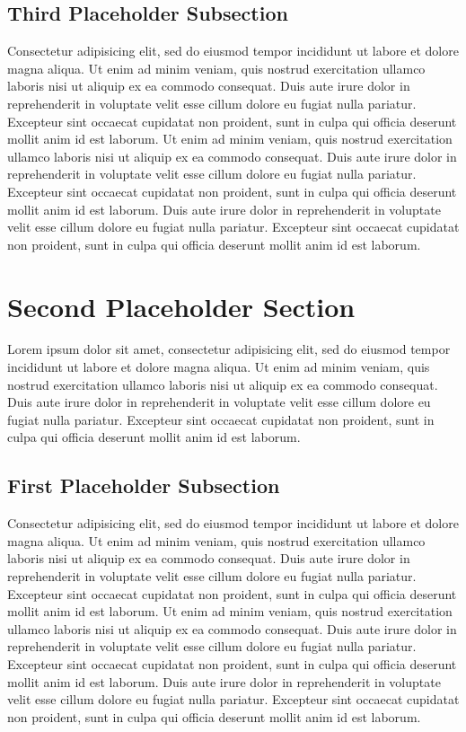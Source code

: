 \documentclass[a4paper]{article}
\begin{document}
\subsection{Third Placeholder Subsection}
Consectetur adipisicing elit, sed do eiusmod tempor incididunt ut labore et
dolore magna aliqua. Ut enim ad minim veniam, quis nostrud exercitation ullamco
laboris nisi ut aliquip ex ea commodo consequat. Duis aute irure dolor in
reprehenderit in voluptate velit esse cillum dolore eu fugiat nulla pariatur.
Excepteur sint occaecat cupidatat non proident, sunt in culpa qui officia
deserunt mollit anim id est laborum. Ut enim ad minim veniam, quis nostrud
exercitation ullamco laboris nisi ut aliquip ex ea commodo consequat. Duis aute
irure dolor in reprehenderit in voluptate velit esse cillum dolore eu fugiat
nulla pariatur. Excepteur sint occaecat cupidatat non proident, sunt in culpa
qui officia deserunt mollit anim id est laborum. Duis aute irure dolor in
reprehenderit in voluptate velit esse cillum dolore eu fugiat nulla pariatur.
Excepteur sint occaecat cupidatat non proident, sunt in culpa qui officia
deserunt mollit anim id est laborum.


\section{Second Placeholder Section}
Lorem ipsum dolor sit amet, consectetur adipisicing elit, sed do eiusmod tempor
incididunt ut labore et dolore magna aliqua. Ut enim ad minim veniam, quis
nostrud exercitation ullamco laboris nisi ut aliquip ex ea commodo consequat.
Duis aute irure dolor in reprehenderit in voluptate velit esse cillum dolore eu
fugiat nulla pariatur. Excepteur sint occaecat cupidatat non proident, sunt in
culpa qui officia deserunt mollit anim id est laborum.

\subsection{First Placeholder Subsection}
Consectetur adipisicing elit, sed do eiusmod tempor incididunt ut labore et
dolore magna aliqua. Ut enim ad minim veniam, quis nostrud exercitation ullamco
laboris nisi ut aliquip ex ea commodo consequat. Duis aute irure dolor in
reprehenderit in voluptate velit esse cillum dolore eu fugiat nulla pariatur.
Excepteur sint occaecat cupidatat non proident, sunt in culpa qui officia
deserunt mollit anim id est laborum. Ut enim ad minim veniam, quis nostrud
exercitation ullamco laboris nisi ut aliquip ex ea commodo consequat. Duis aute
irure dolor in reprehenderit in voluptate velit esse cillum dolore eu fugiat
nulla pariatur. Excepteur sint occaecat cupidatat non proident, sunt in culpa
qui officia deserunt mollit anim id est laborum. Duis aute irure dolor in
reprehenderit in voluptate velit esse cillum dolore eu fugiat nulla pariatur.
Excepteur sint occaecat cupidatat non proident, sunt in culpa qui officia
deserunt mollit anim id est laborum.
\end{document}

